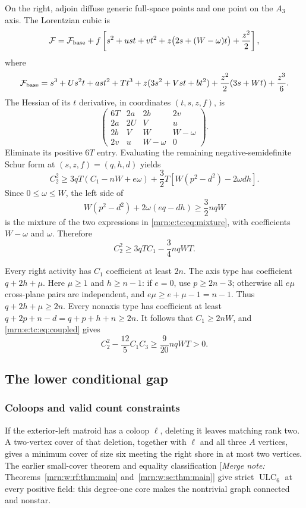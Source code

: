 \documentclass[11pt,a4paper]{article}
\theoremstyle{remark}\newtheorem{remark}[theorem]{Remark}
\newcommand{\ULC}{\operatorname{ULC}}      %
\newcommand{\mnote}[1]{[\textit{Merge note:} #1]}
\begin{document}
On the right, adjoin diffuse generic full-space points and one point on the $A_3$ axis. The Lorentzian cubic is
\[
 \mathcal F=\mathcal F_{\rm base}
 +f\left[s^2+ust+vt^2+z\bigl(2s+(W-\omega)t\bigr)+\frac{z^2}{2}\right],
\]
where
\[
 \mathcal F_{\rm base}=s^3+Us^2t+ast^2+Tt^3
 +z(3s^2+Vst+bt^2)+\frac{z^2}{2}(3s+Wt)+\frac{z^3}{6}.
\]
The Hessian of its $t$ derivative, in coordinates $(t,s,z,f)$, is
\[
 \begin{pmatrix}
 6T&2a&2b&2v\\
 2a&2U&V&u\\
 2b&V&W&W-\omega\\
 2v&u&W-\omega&0
 \end{pmatrix}.
\]
Eliminate its positive $6T$ entry. Evaluating the remaining negative-semidefinite Schur form at $(s,z,f)=(q,h,d)$ yields
\begin{equation}\label{mrn:e:tc:eq:right}
 C_2^2\ge3qT(C_1-nW+e\omega)
 +\frac32T\left[W(p^2-d^2)-2\omega dh\right].
\end{equation}
Since $0\le\omega\le W$, the left side of
\[
 W(p^2-d^2)+2\omega(eq-dh)\ge\frac32nqW
\]
is the mixture of the two expressions in \eqref{mrn:e:tc:eq:mixture}, with coefficients $W-\omega$ and $\omega$. Therefore
\begin{equation}\label{mrn:e:tc:eq:coupled}
 C_2^2\ge3qTC_1-\frac34nqWT.
\end{equation}

Every right activity has $C_1$ coefficient at least $2n$. The axis type has coefficient $q+2h+\mu$. Here $\mu\ge1$ and $h\ge n-1$: if $e=0$, use $p\ge2n-3$; otherwise all $e\mu$ cross-plane pairs are independent, and $e\mu\ge e+\mu-1=n-1$. Thus $q+2h+\mu\ge2n$. Every nonaxis type has coefficient at least $q+2p+n-d=q+p+h+n\ge2n$. It follows that $C_1\ge2nW$, and \eqref{mrn:e:tc:eq:coupled} gives
\begin{equation}\label{mrn:e:tc:eq:higher}
 C_2^2-\frac{12}{5}C_1C_3\ge\frac9{20}nqWT>0.
\end{equation}

\subsection{The lower conditional gap}
\subsubsection{Coloops and valid count constraints}
If the exterior-left matroid has a coloop $\ell$, deleting it leaves matching rank two. A two-vertex cover of that deletion, together with $\ell$ and all three $A$ vertices, gives a minimum cover of size six meeting the right shore in at most two vertices. The earlier small-cover theorem and equality classification \cite{b:m74,b:m72} \mnote{Theorems~\ref{mrn:w:rf:thm:main} and~\ref{mrn:w:se:thm:main}} give strict $\ULC_6$ at every positive field: this degree-one core makes the nontrivial graph connected and nonstar.
\end{document}
